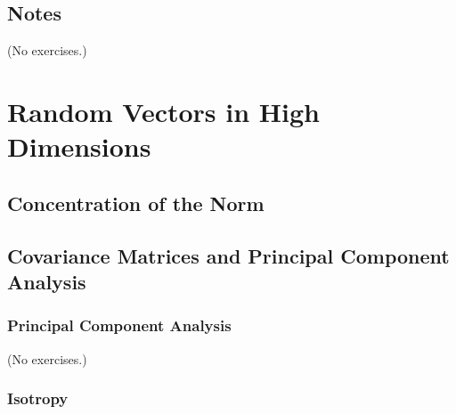 \documentclass{report}
\theoremstyle{definition}
\newenvironment{exercise}[1]{
  \renewcommand\theexerciseimpl{#1}
  \exerciseimpl
}{\endexerciseimpl}
\begin{document}
\begin{exercise}{2.8.5}
\end{exercise}

\begin{exercise}{2.8.6}
\end{exercise}

\section{Notes}

(No exercises.)


\chapter{Random Vectors in High Dimensions}

\section{Concentration of the Norm}

\begin{exercise}{3.1.4}
\end{exercise}

\begin{exercise}{3.1.5}
\end{exercise}

\begin{exercise}{3.1.6}
\end{exercise}

\begin{exercise}{3.1.7}
\end{exercise}

\section{Covariance Matrices and Principal Component Analysis}

\subsection{Principal Component Analysis}

(No exercises.)

\subsection{Isotropy}

\begin{exercise}{3.2.2}
\end{exercise}
\end{document}
